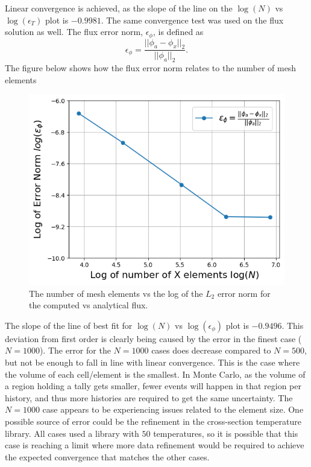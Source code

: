 \documentclass[letterpaper]{mc2023}
\begin{document}
Linear convergence is achieved, as the slope of the line on the $\log(N)$ vs $\log(\epsilon_{T})$ plot is $-0.9981$. The same convergence test
was used on the flux solution as well. The flux error norm, $\epsilon_{\phi}$, is defined as
\begin{equation}
    \epsilon_{\phi} =  \frac{|| \phi_{a} - \phi_{x} ||_{2}}{|| \phi_{a} ||_{2}}.
\end{equation}
The figure below shows how the flux error norm relates to the number of mesh elements
\begin{figure}[H]
    \centering
    \includegraphics[width=0.55\linewidth]{figures/flux_error_norms.png}
    \caption{The number of mesh elements vs the log of the $L_{2}$ error norm for the computed vs analytical flux.}
    \label{fig:flux_error_study}
\end{figure}
The slope of the line of best fit for $\log(N)$ vs $\log(\epsilon_{\phi})$ plot is $-0.9496$. This deviation from first order is clearly being
caused by the error in the finest case ($N=1000$). The error for the $N=1000$ cases does decrease compared to $N=500$, but not be enough to fall in
line with linear convergence. This is the case where the volume of each cell/element is the smallest. In Monte Carlo, as the volume of a region holding
a tally gets smaller, fewer events will happen in that region per history, and thus more histories are required to get the same uncertainty. The
$N=1000$ case appears to be experiencing issues related to the element size. One possible source of error could be the refinement in the cross-section
temperature library. All cases used a library with $50$ temperatures, so it is possible that this case is reaching a limit where more data refinement
would be required to achieve the expected convergence that matches the other cases.
\end{document}
